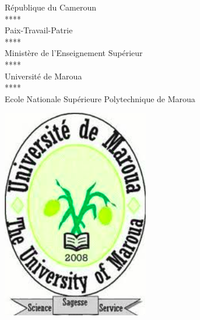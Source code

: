 \documentclass[12pt,a4paper]{report}
\begin{document}

\thispagestyle{empty}
\begin{minipage}[c]{.35\textwidth}
    \footnotesize
    \begin{center}
    République du Cameroun\\
	****\\
	Paix-Travail-Patrie\\
	****\\
	Ministère de l’Enseignement Supérieur\\
	****\\
	Université de Maroua\\
	****\\
	Ecole Nationale Supérieure Polytechnique de Maroua\\
    \end{center}
\end{minipage}
\begin{minipage}[c]{.3\textwidth}
	\begin{center}
		\includegraphics[scale=0.4]{univ.png}
	\end{center}
\end{minipage}
\end{document}
